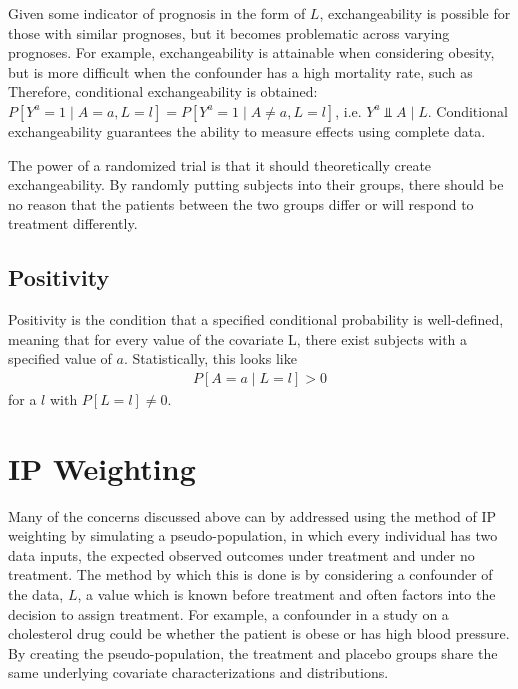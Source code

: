 Given some indicator of prognosis in the form of $L$, exchangeability is possible for those with similar prognoses, but it becomes problematic across varying prognoses.  For example, exchangeability is attainable when considering obesity, but is more difficult when the confounder has a high mortality rate, such as    Therefore, conditional exchangeability is obtained: $P[Y^a = 1 \mid A = a, L=l] = P[Y^a = 1 \mid A \neq a, L=l]$, i.e. $Y^{a} \Perp A\mid L$. \cite{hernan_robins_2016}  Conditional exchangeability guarantees the ability to measure effects using complete data.  

The power of a randomized trial is that it should theoretically create exchangeability.  By randomly putting subjects into their groups, there should be no reason that the patients between the two groups differ or will respond to treatment differently.  
      
\subsection{Positivity} 
Positivity is the condition that a specified conditional probability is well-defined, meaning that for every value of the covariate L, there exist subjects with a specified value of $a$.\cite{hernan2006estimating}  Statistically, this looks like 
\begin{align}
P[A=a \mid L=l] > 0 
\end{align} 
for a $l$ with $P[L=l] \neq 0$. 



\section{IP Weighting} \label{IP Weighting} 
Many of the concerns discussed above can by addressed using the method of IP weighting by simulating a pseudo-population, in which every individual has two data inputs, the expected observed outcomes under treatment and under no treatment.  The method by which this is done is by considering a confounder of the data, $L$, a value which is known before treatment and often factors into the decision to assign treatment.  For example, a confounder in a study on a cholesterol drug could be whether the patient is obese or has high blood pressure.  By creating the pseudo-population, the treatment and placebo groups share the same underlying covariate characterizations and distributions. 

